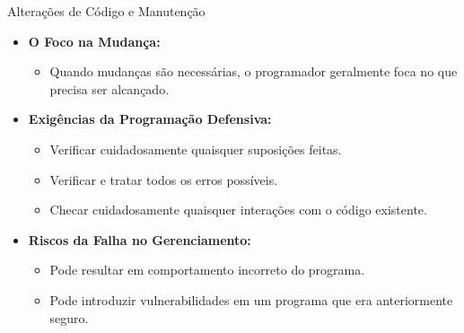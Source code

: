 \begin{frame}{Alterações de Código e Manutenção}
    \begin{itemize}
        \item \textbf{O Foco na Mudança:}
              \begin{itemize}
                  \item Quando mudanças são necessárias, o programador geralmente foca no que precisa ser alcançado.
              \end{itemize}

        \item \textbf{Exigências da Programação Defensiva:}
              \begin{itemize}
                  \item Verificar cuidadosamente quaisquer suposições feitas.
                  \item Verificar e tratar todos os erros possíveis.
                  \item Checar cuidadosamente quaisquer interações com o código existente.
              \end{itemize}

        \item \textbf{Riscos da Falha no Gerenciamento:}
              \begin{itemize}
                  \item Pode resultar em comportamento incorreto do programa.
                  \item Pode introduzir vulnerabilidades em um programa que era anteriormente seguro.
              \end{itemize}
    \end{itemize}
\end{frame}

